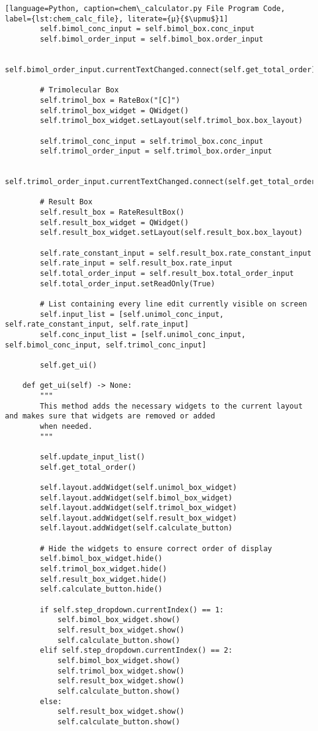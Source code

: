 \begin{lstlisting}[language=Python, caption=chem\_calculator.py File Program Code, label={lst:chem_calc_file}, literate={μ}{$\upmu$}1]
        self.bimol_conc_input = self.bimol_box.conc_input
        self.bimol_order_input = self.bimol_box.order_input

        self.bimol_order_input.currentTextChanged.connect(self.get_total_order)

        # Trimolecular Box
        self.trimol_box = RateBox("[C]")
        self.trimol_box_widget = QWidget()
        self.trimol_box_widget.setLayout(self.trimol_box.box_layout)

        self.trimol_conc_input = self.trimol_box.conc_input
        self.trimol_order_input = self.trimol_box.order_input

        self.trimol_order_input.currentTextChanged.connect(self.get_total_order)

        # Result Box
        self.result_box = RateResultBox()
        self.result_box_widget = QWidget()
        self.result_box_widget.setLayout(self.result_box.box_layout)

        self.rate_constant_input = self.result_box.rate_constant_input
        self.rate_input = self.result_box.rate_input
        self.total_order_input = self.result_box.total_order_input
        self.total_order_input.setReadOnly(True)

        # List containing every line edit currently visible on screen
        self.input_list = [self.unimol_conc_input, self.rate_constant_input, self.rate_input]
        self.conc_input_list = [self.unimol_conc_input, self.bimol_conc_input, self.trimol_conc_input]

        self.get_ui()

    def get_ui(self) -> None:
        """
        This method adds the necessary widgets to the current layout and makes sure that widgets are removed or added
        when needed.
        """

        self.update_input_list()
        self.get_total_order()

        self.layout.addWidget(self.unimol_box_widget)
        self.layout.addWidget(self.bimol_box_widget)
        self.layout.addWidget(self.trimol_box_widget)
        self.layout.addWidget(self.result_box_widget)
        self.layout.addWidget(self.calculate_button)

        # Hide the widgets to ensure correct order of display
        self.bimol_box_widget.hide()
        self.trimol_box_widget.hide()
        self.result_box_widget.hide()
        self.calculate_button.hide()

        if self.step_dropdown.currentIndex() == 1:
            self.bimol_box_widget.show()
            self.result_box_widget.show()
            self.calculate_button.show()
        elif self.step_dropdown.currentIndex() == 2:
            self.bimol_box_widget.show()
            self.trimol_box_widget.show()
            self.result_box_widget.show()
            self.calculate_button.show()
        else:
            self.result_box_widget.show()
            self.calculate_button.show()


\end{lstlisting}
